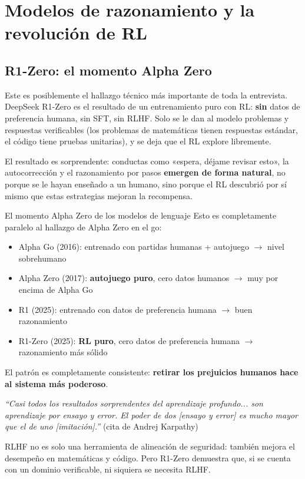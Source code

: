 \section{Modelos de razonamiento y la revolución de RL}

\subsection{R1-Zero: el momento Alpha Zero}

Este es posiblemente el hallazgo técnico más importante de toda la entrevista. DeepSeek R1-Zero es el resultado de un entrenamiento puro con RL: \textbf{sin} datos de preferencia humana, sin SFT, sin RLHF. Solo se le dan al modelo problemas y respuestas verificables (los problemas de matemáticas tienen respuestas estándar, el código tiene pruebas unitarias), y se deja que el RL explore libremente.

El resultado es sorprendente: conductas como «espera, déjame revisar esto», la autocorrección y el razonamiento por pasos \textbf{emergen de forma natural}, no porque se le hayan enseñado a un humano, sino porque el RL descubrió por sí mismo que estas estrategias mejoran la recompensa.

\begin{importantbox}{El momento Alpha Zero de los modelos de lenguaje}
Esto es completamente paralelo al hallazgo de Alpha Zero en el go:
\begin{itemize}
    \item Alpha Go (2016): entrenado con partidas humanas + autojuego $\to$ nivel sobrehumano
    \item Alpha Zero (2017): \textbf{autojuego puro}, cero datos humanos $\to$ muy por encima de Alpha Go
    \item R1 (2025): entrenado con datos de preferencia humana $\to$ buen razonamiento
    \item R1-Zero (2025): \textbf{RL puro}, cero datos de preferencia humana $\to$ razonamiento más sólido
\end{itemize}

El patrón es completamente consistente: \textbf{retirar los prejuicios humanos hace al sistema más poderoso}.

\textit{``Casi todos los resultados sorprendentes del aprendizaje profundo... son aprendizaje por ensayo y error. El poder de dos {[}ensayo y error{]} es mucho mayor que el de uno {[}imitación{]}.''} (cita de Andrej Karpathy)

RLHF no es solo una herramienta de alineación de seguridad: también mejora el desempeño en matemáticas y código. Pero R1-Zero demuestra que, si se cuenta con un dominio verificable, ni siquiera se necesita RLHF.
\end{importantbox}


